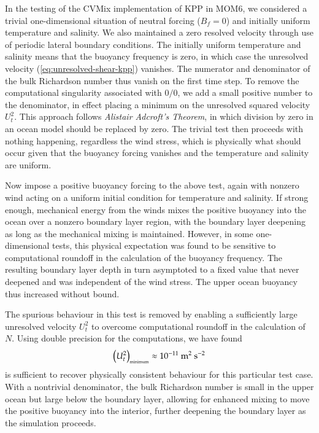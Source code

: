 In the testing of the CVMix implementation of KPP in MOM6, we
considered a trivial one-dimensional situation of neutral forcing
($B_{f} = 0$) and initially uniform temperature and salinity.  We also
maintained a zero resolved velocity through use of periodic lateral
boundary conditions.  The initially uniform temperature and salinity
means that the buoyancy frequency is zero, in which case the
unresolved velocity (\ref{eq:unresolved-shear-kpp}) vanishes.  The
numerator and denominator of the bulk Richardson number thus vanish on
the first time step.  To remove the computational singularity
associated with $0/0$, we add a small positive number to the
denominator, in effect placing a minimum on the unresolved squared
velocity $U_{t}^{2}$.  This approach follows {\it Alistair Adcroft's
  Theorem}, in which division by zero in an ocean model should be
replaced by zero.  The trivial test then proceeds with nothing
happening, regardless the wind stress, which is physically what should
occur given that the buoyancy forcing vanishes and the temperature and
salinity are uniform.

Now impose a positive buoyancy forcing to the above test, again with
nonzero wind acting on a uniform initial condition for temperature and
salinity.  If strong enough, mechanical energy from the winds mixes
the positive buoyancy into the ocean over a nonzero boundary layer
region, with the boundary layer deepening as long as the mechanical
mixing is maintained.  However, in some one-dimensional tests, this
physical expectation was found to be sensitive to computational
roundoff in the calculation of the buoyancy frequency.  The resulting
boundary layer depth in turn asymptoted to a fixed value that never
deepened and was independent of the wind stress.  The upper ocean
buoyancy thus increased without bound.  

The spurious behaviour in this test is removed by enabling a
sufficiently large unresolved velocity $U_{t}^{2}$ to overcome
computational roundoff in the calculation of $N$.  Using double
precision for the computations, we have found
\begin{equation}
  \left( U_{t}^{2} \right)_{\mbox{\tiny minimum}} \approx 10^{-11}~\mbox{m}^{2}~\mbox{s}^{-2}  
\end{equation}
is sufficient to recover physically consistent behaviour for this
particular test case.  With a nontrivial denominator, the bulk
Richardson number is small in the upper ocean but large below the
boundary layer, allowing for enhanced mixing to move the positive
buoyancy into the interior, further deepening the boundary layer as
the simulation proceeds.


